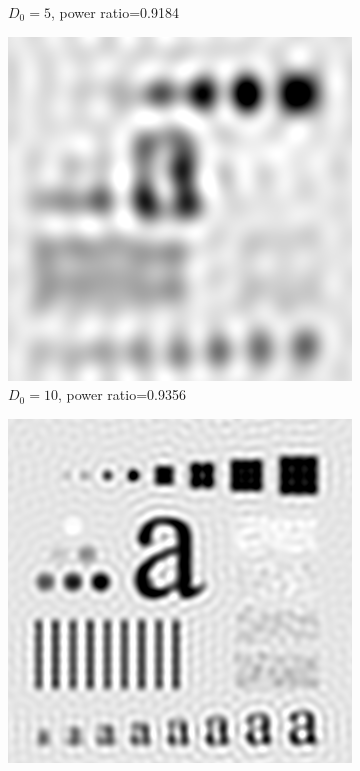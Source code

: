\begin{figure}[h!]
\begin{subfigure}[b]{0.45\linewidth}
		\caption{$D_0=5$, power ratio=0.9184}
		\label{fig:ILPF_5}
	\end{subfigure}
	\begin{subfigure}[b]{0.45\linewidth}
		\includegraphics[width=\linewidth]{myfigure/p3/ILPF_10.png}
		\caption{$D_0=10$, power ratio=0.9356}
		\label{fig:ILPF_10}
	\end{subfigure}
	\begin{subfigure}[b]{0.45\linewidth}
		\includegraphics[width=\linewidth]{myfigure/p3/ILPF_30.png}

\end{subfigure}
\end{figure}
